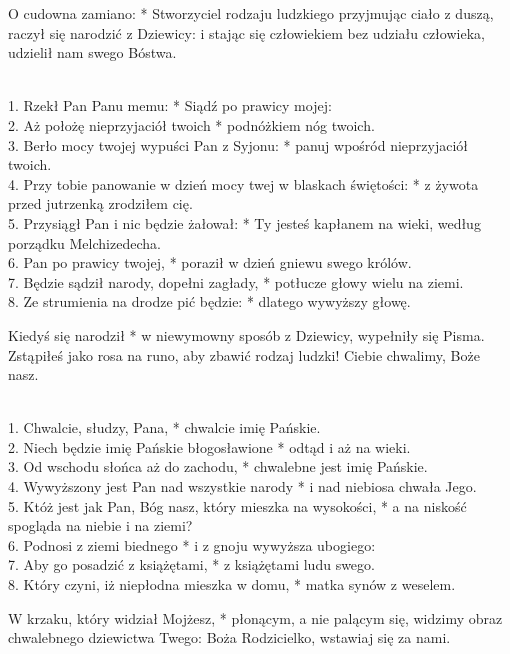 \small
\vspace{-5mm}
 O cudowna zamiano: * Stworzyciel rodzaju ludzkiego przyjmując ciało z duszą, raczył się narodzić z Dziewicy: i stając się człowiekiem bez udziału człowieka, udzielił nam swego Bóstwa.

\\
1. Rzekł Pan Panu memu: * Siądź po prawicy mojej:\\
2. Aż położę nieprzyjaciół twoich * podnóżkiem nóg twoich.\\
3. Berło mocy twojej wypuści Pan z Syjonu: * panuj wpośród nieprzyjaciół twoich.\\
4. Przy tobie panowanie w dzień mocy twej w blaskach świętości: * z żywota przed jutrzenką zrodziłem cię.\\
5. Przysiągł Pan i nic będzie żałował: * Ty jesteś kapłanem na wieki, według porządku Melchizedecha.\\
6. Pan po prawicy twojej, * poraził w dzień gniewu swego królów.\\
7. Będzie sądził narody, dopełni zagłady, * potłucze głowy wielu na ziemi.\\
8. Ze strumienia na drodze pić będzie: * dlatego wywyższy głowę.

 Kiedyś się narodził * w niewymowny sposób z Dziewicy, wypełniły się Pisma. Zstąpiłeś jako rosa na runo, aby zbawić rodzaj ludzki! Ciebie chwalimy, Boże nasz.

\\
1. Chwalcie, słudzy, Pana, * chwalcie imię Pańskie.\\
2. Niech będzie imię Pańskie błogosławione * odtąd i aż na wieki.\\
3. Od wschodu słońca aż do zachodu, * chwalebne jest imię Pańskie.\\
4. Wywyższony jest Pan nad wszystkie narody * i nad niebiosa chwała Jego.\\
5. Któż jest jak Pan, Bóg nasz, który mieszka na wysokości, * a na niskość spogląda na niebie i na ziemi?\\
6. Podnosi z ziemi biednego * i z gnoju wywyższa ubogiego:\\
7. Aby go posadzić z książętami, * z książętami ludu swego.\\
8. Który czyni, iż niepłodna mieszka w domu, * matka synów z weselem.

 W krzaku, który widział Mojżesz, * płonącym, a nie palącym się, widzimy obraz chwalebnego dziewictwa Twego: Boża Rodzicielko, wstawiaj się za nami.

